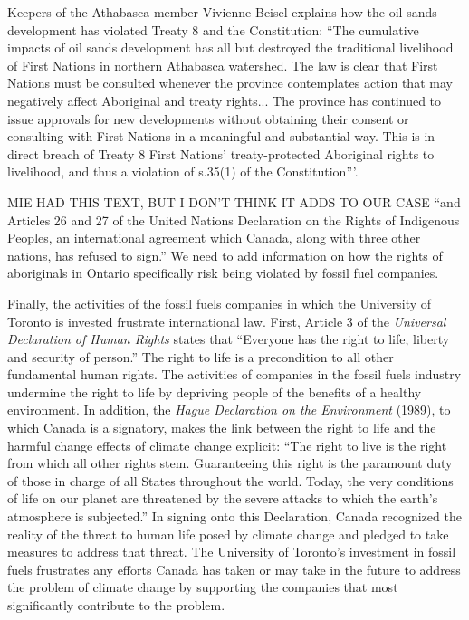 Keepers of the Athabasca member Vivienne Beisel explains how the oil sands development has violated Treaty 8 and the Constitution: ``The cumulative impacts of oil sands development has all but destroyed the traditional livelihood of First Nations in northern Athabasca watershed. 
The law is clear that First Nations must be consulted whenever the province contemplates action that may negatively affect Aboriginal and treaty rights...
The province has continued to issue approvals for new developments without obtaining their consent or consulting with First Nations in a meaningful and substantial way. 
This is in direct breach of Treaty 8 First Nations' treaty-protected Aboriginal rights to livelihood, and thus a violation of s.35(1) of the Constitution'''.


\begin{vcom}
	MIE HAD THIS TEXT, BUT I DON'T THINK IT ADDS TO OUR CASE ``and Articles 26 and 27 of the United Nations Declaration on the Rights of Indigenous Peoples, an international agreement which Canada, along with three other nations, has refused to sign.'' We need to add information on how the rights of aboriginals in Ontario specifically risk being violated by fossil fuel companies.
\end{vcom}



Finally, the activities of the fossil fuels companies in which the University of Toronto is invested frustrate international law.  
First, Article 3 of the \emph{Universal Declaration of Human Rights} states that ``Everyone has the right to life, liberty and security of person.''   
The right to life is a precondition to all other fundamental human rights.  
The activities of companies in the fossil fuels industry undermine the right to life by depriving people of the benefits of a healthy environment.  
In addition, the \emph{Hague Declaration on the Environment} (1989), to which Canada is a signatory, makes the link between the right to life and the harmful change effects of climate change explicit: ``The right to live is the right from which all other rights stem.  
Guaranteeing this right is the paramount duty of those in charge of all States throughout the world.  
Today, the very conditions of life on our planet are threatened by the severe attacks to which the earth’s atmosphere is subjected.''   
In signing onto this Declaration, Canada recognized the reality of the threat to human life posed by climate change and pledged to take measures to address that threat.  
The University of Toronto’s investment in fossil fuels frustrates any efforts Canada has taken or may take in the future to address the problem of climate change by supporting the companies that most significantly contribute to the problem.	

